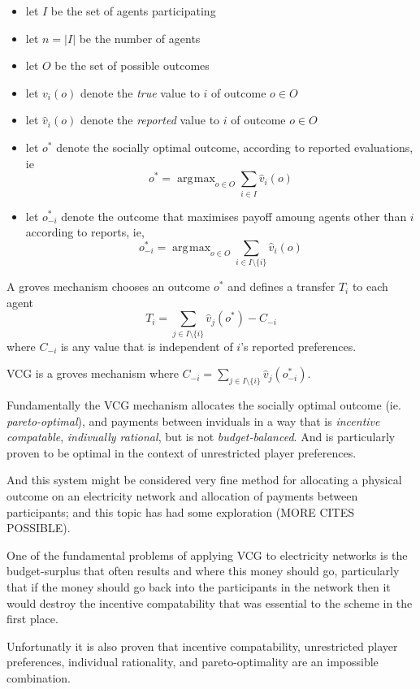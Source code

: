 \documentclass{article}
\DeclareMathOperator*{\argmax}{\arg\!\max}
\begin{document}
\begin{itemize}
    \item let $I$ be the set of agents participating
    \item let $n=|I|$ be the number of agents
    \item let $O$ be the set of possible outcomes
    \item let $v_i(o)$ denote the \textit{true} value to $i$ of outcome $o\in O$
    \item let $\hat{v}_i(o)$ denote the \textit{reported} value to $i$ of outcome $o\in O$
    \item let $o^*$ denote the socially optimal outcome, according to reported evaluations, ie $$o^*=\argmax_{o\in O}\sum_{i\in I}\hat{v}_i(o)$$
    \item let $o^*_{-i}$ denote the outcome that maximises payoff amoung agents other than $i$ according to reports, ie, $$o^*_{-i}=\argmax_{o\in O}\sum_{i\in I\setminus\{i\}}\hat{v}_i(o)$$
\end{itemize}

A groves mechanism chooses an outcome $o^*$ and defines a transfer $T_i$ to each agent $$T_i=\sum_{j\in I\setminus\{i\}}\hat{v}_j(o^*) - C_{-i}$$
where $C_{-i}$ is any value that is independent of $i$'s reported preferences.

VCG is a groves mechanism where $C_{-i}=\sum_{j\in I\setminus\{i\}}\hat{v}_j(o^*_{-i})$.

Fundamentally the VCG mechanism allocates the socially optimal outcome (ie. \textit{pareto-optimal}), and payments between inviduals in a way that is \textit{incentive compatable}, \textit{indivually rational}, but is not \textit{budget-balanced}.
And is particularly proven to be optimal in the context of unrestricted player preferences.

And this system might be considered very fine method for allocating a physical outcome on an electricity network and allocation of payments between participants; and this topic has had some exploration \cite{SESSA2017189, 8264596} (MORE CITES POSSIBLE).

One of the fundamental problems of applying VCG to electricity networks is the budget-surplus that often results and where this money should go, particularly that if the money should go back into the participants in the network then it would destroy the incentive compatability that was essential to the scheme in the first place.

Unfortunatly it is also proven that incentive compatability, unrestricted player preferences, individual rationality, and pareto-optimality are an impossible combination.
\end{document}
